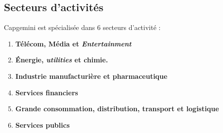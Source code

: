 \subsection{Secteurs d'activités}
Capgemini est spécialisée dans 6 secteurs d'activité :
\\
\begin{enumerate}
\item \textbf{Télécom, Média et \textit{Entertainment}}
\item \textbf{\'Energie, \textit{utilities} et chimie.}
\item \textbf{Industrie manufacturière et pharmaceutique}
\item \textbf{Services financiers}
\item \textbf{Grande consommation, distribution, transport et logistique}
\item \textbf{Services publics}\\
\end{enumerate}
\begin{figure}[h]
\end{figure}
\newpage
